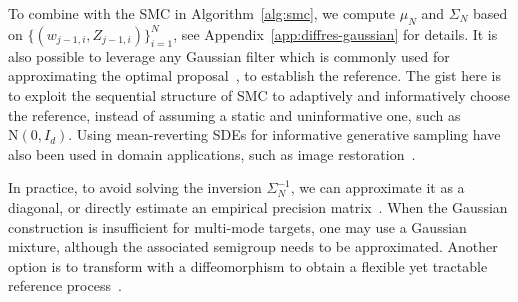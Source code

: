 \documentclass{article}
\begin{document}
%
To combine with the SMC in Algorithm~\ref{alg:smc}, we compute $\mu_N$ and $\Sigma_N$ based on $\bigl\lbrace (w_{j-1, i}, Z_{j-1, i}) \bigr\rbrace_{i=1}^N$, see Appendix~\ref{app:diffres-gaussian} for details. 
It is also possible to leverage any Gaussian filter which is commonly used for approximating the optimal proposal~\citep{Vandermerwe2000}, to establish the reference. 
The gist here is to exploit the sequential structure of SMC to adaptively and informatively choose the reference, instead of assuming a static and uninformative one, such as $\mathrm{N}(0, I_d)$. 
Using mean-reverting SDEs for informative generative sampling have also been used in domain applications, such as image restoration~\citep{Luo2023IRSDE, Luo2024rsta}.

In practice, to avoid solving the inversion $\Sigma_N^{-1}$, we can approximate it as a diagonal, or directly estimate an empirical precision matrix~\citep{Yuan2007, Fan2016}. 
When the Gaussian construction is insufficient for multi-mode targets, one may use a Gaussian mixture, although the associated semigroup needs to be approximated. 
Another option is to transform with a diffeomorphism to obtain a flexible yet tractable reference process~\citep{Deng2020}. 
\end{document}
